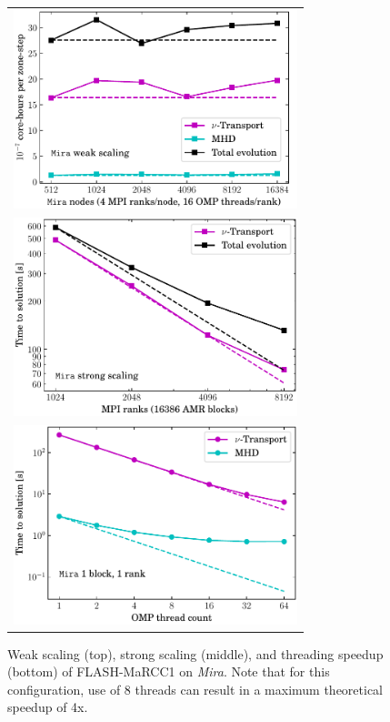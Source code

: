 \begin{figure}

  \begin{tabular}{r}
    \includegraphics[width=3.25in]{figs/wkScaleSparkM1} \\
    \includegraphics[width=3.25in]{figs/strScaleSparkM1} \\
    \includegraphics[width=3.25in]{figs/thrdSpeedupSparkM1}
  \end{tabular}
  \caption{Weak scaling (top), strong scaling (middle), and threading
  speedup (bottom) of FLASH-MaRCC1 on {\it Mira}.  Note that for this configuration, use of 8 threads can result in a maximum theoretical speedup of 4x.}
  \label{fig:scaling}
\end{figure}
